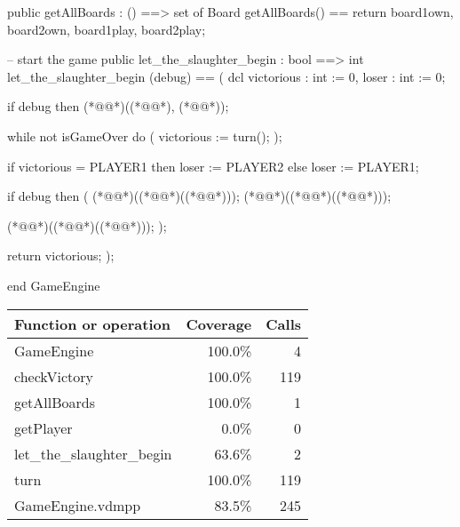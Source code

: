 \begin{vdm_al}
  public getAllBoards : () ==> set of Board
   getAllBoards() ==
    return { board1own, board2own, board1play, board2play};
    
  -- start the game
  public let_the_slaughter_begin : bool ==> int
   let_the_slaughter_begin (debug) ==
   (
    dcl victorious : int := 0, loser : int := 0;
    
    if debug then (*@@*)((*@@*), (*@@*));
    
    while not isGameOver do
    (
     victorious := turn();
    );
    
    if victorious = PLAYER1 then loser := PLAYER2
    else loser := PLAYER1;
    
    if debug then (
     (*@@*)((*@@*)((*@@*)));
     (*@@*)((*@@*)((*@@*)));
     
     (*@@*)((*@@*)((*@@*)));
    );
    
    return victorious;
   );
   
end GameEngine
\end{vdm_al}
\bigskip
\begin{longtable}{|l|r|r|}
\hline
Function or operation & Coverage & Calls \\
\hline
\hline
GameEngine & 100.0\% & 4 \\
\hline
checkVictory & 100.0\% & 119 \\
\hline
getAllBoards & 100.0\% & 1 \\
\hline
getPlayer & 0.0\% & 0 \\
\hline
let\_the\_slaughter\_begin & 63.6\% & 2 \\
\hline
turn & 100.0\% & 119 \\
\hline
\hline
GameEngine.vdmpp & 83.5\% & 245 \\
\hline
\end{longtable}

